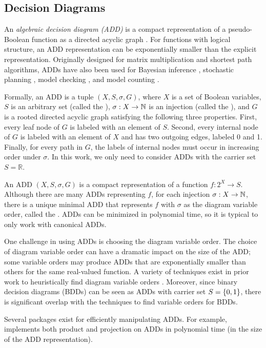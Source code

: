 \subsection{Decision Diagrams}
\label{sec:background:dd}
An \emph{algebraic decision diagram (ADD)} is a compact representation of a pseudo-Boolean function as a directed acyclic graph \cite{bahar1997algebraic}.
For functions with logical structure, an ADD representation can be exponentially smaller than the explicit representation.
Originally designed for matrix multiplication and shortest path algorithms, ADDs have also been used for Bayesian inference \cite{chavira2007compiling,gogate2011approximation}, stochastic planning \cite{hoey1999spudd}, model checking \cite{kwiatkowska2007stochastic}, and model counting \cite{fargier2014knowledge,DPV20}.

Formally, an ADD is a tuple $(X, S, \sigma, G)$, where $X$ is a set of Boolean variables, $S$ is an arbitrary set (called the ), $\sigma: X \to \mathbb{N}$ is an injection (called the ), and $G$ is a rooted directed acyclic graph satisfying the following three properties.
First, every leaf node of $G$ is labeled with an element of $S$.
Second, every internal node of $G$ is labeled with an element of $X$ and has two outgoing edges, labeled 0 and 1.
Finally, for every path in $G$, the labels of internal nodes must occur in increasing order under $\sigma$.
In this work, we only need to consider ADDs with the carrier set $S = \mathbb{R}$.

An ADD $(X, S, \sigma, G)$ is a compact representation of a function $f: 2^X \to S$.
Although there are many ADDs representing $f$, for each injection $\sigma: X \to \mathbb{N}$, there is a unique minimal ADD that represents $f$ with $\sigma$ as the diagram variable order, called the .
ADDs can be minimized in polynomial time, so it is typical to only work with canonical ADDs.

One challenge in using ADDs is choosing the diagram variable order.
The choice of diagram variable order can have a dramatic impact on the size of the ADD; some variable orders may produce ADDs that are exponentially smaller than others for the same real-valued function.
A variety of techniques exist in prior work to heuristically find diagram variable orders \cite{tarjan1984simple,koster2001treewidth,dechter03}.
Moreover, since binary decision diagrams (BDDs) \cite{bryant1986graph} can be seen as ADDs with carrier set $S = \left\{ 0, 1 \right\}$, there is significant overlap with the techniques to find variable orders for BDDs.

Several packages exist for efficiently manipulating ADDs.
For example, \cudd{} \cite{somenzi2015cudd} implements both product and projection on ADDs in polynomial time (in the size of the ADD representation).
